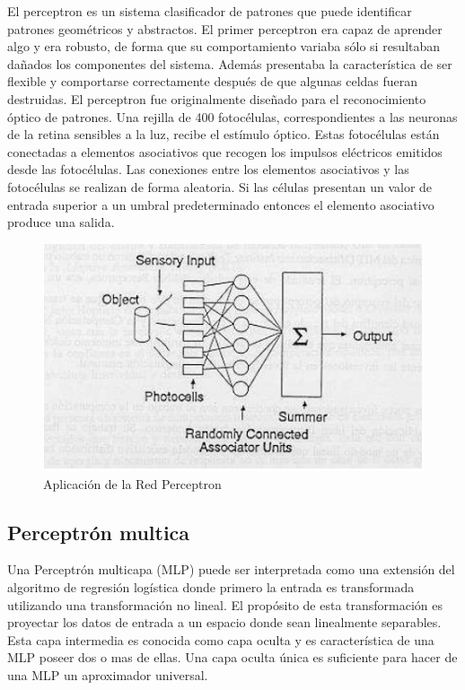 \vspace{1\baselineskip}
El perceptron es un sistema clasificador de patrones que puede identificar patrones geométricos y abstractos. El primer perceptron era capaz de aprender algo y era robusto, de forma que su comportamiento variaba sólo si resultaban dañados los componentes del sistema. 
Además presentaba la característica de ser flexible y comportarse correctamente después de que algunas celdas fueran destruidas.
El perceptron fue originalmente diseñado para el reconocimiento óptico de patrones.
Una rejilla de 400 fotocélulas, correspondientes a las neuronas de la retina sensibles a la luz, recibe el estímulo óptico. Estas fotocélulas están conectadas a elementos asociativos que recogen los impulsos eléctricos emitidos desde las fotocélulas. Las
conexiones entre los elementos asociativos y las fotocélulas se realizan de forma aleatoria.
Si las células presentan un valor de entrada superior a un umbral predeterminado entonces el elemento asociativo produce una salida\cite{olabe1998redes}.

\begin{figure}[H]
  \begin{center}
    \includegraphics[scale=0.90]{./perceptron.png}
    \caption{Aplicación de la Red Perceptron}
    \label{fig:perceptron}
  \end{center}
\end{figure}

\subsection{Perceptrón multica}
Una Perceptrón multicapa (MLP) puede ser interpretada como una extensión del algoritmo de regresión logística donde primero la entrada es transformada utilizando una transformación no lineal\cite{de2014aprendizaje}. El propósito de esta transformación es proyectar los datos de entrada a un espacio donde sean linealmente separables.
Esta capa intermedia es conocida como capa oculta y es característica de una MLP poseer dos o mas de ellas. Una capa oculta única es suficiente para hacer de una MLP un aproximador universal.

